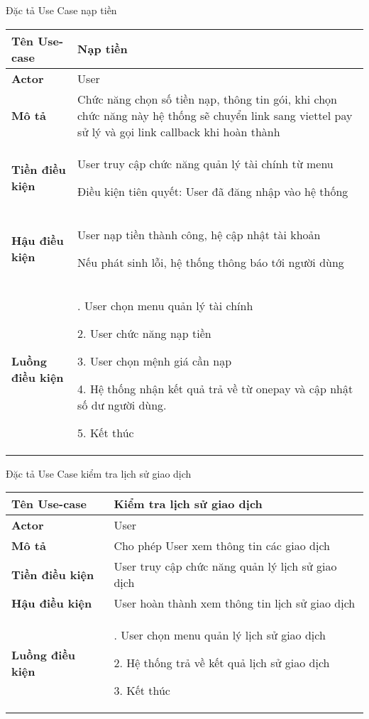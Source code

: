 \documentclass[12pt,a4paper]{report}
\begin{document}
 Đặc tả Use Case nạp tiền
 \begin{center}
 \begin{tabular}{|>{\raggedright\arraybackslash}m{4cm}|>{\raggedright\arraybackslash}m{11.5cm}|}
 \hline 
 \textbf{Tên Use-case} & Nạp tiền \\ 
 \hline 
 \textbf{Actor} & User \\ 
 \hline 
\textbf{ Mô tả} & Chức năng chọn số tiền nạp, thông tin gói, khi chọn chức năng này hệ thống sẽ chuyển link sang viettel pay sử lý và gọi link callback khi hoàn thành \\ 
 \hline 
 \textbf{Tiền điều kiện} & User truy cập chức năng quản lý tài chính từ menu
 
						   Điều kiện tiên quyết: User đã đăng nhập vào hệ thống\\ 
 \hline 
 \textbf{Hậu điều kiện} & User nạp tiền thành công, hệ cập nhật tài khoản
 
 Nếu phát sinh lỗi, hệ thống thông báo tới người dùng \\ 
 \hline 
 \textbf{Luồng điều kiện} & 1. User chọn menu quản lý tài chính
 
				   2. User chức năng nạp tiền

			       3. User chọn mệnh giá cần nạp

				   4. Hệ thống nhận kết quả trả về từ onepay và cập nhật số dư người dùng.
				   
				   5. Kết thúc\\ 
 \hline  
 \end{tabular} 
 \end{center}
 
 Đặc tả Use Case kiểm tra lịch sử giao dịch
 \begin{center}
 \begin{tabular}{|>{\raggedright\arraybackslash}m{4cm}|>{\raggedright\arraybackslash}m{11.5cm}|}
 \hline 
 \textbf{Tên Use-case} & Kiểm tra lịch sử giao dịch \\ 
 \hline 
 \textbf{Actor} & User \\ 
 \hline 
\textbf{ Mô tả} & Cho phép User xem thông tin các giao dịch \\ 
 \hline 
 \textbf{Tiền điều kiện} & User truy cập chức năng quản lý lịch sử giao dịch\\ 
 \hline 
 \textbf{Hậu điều kiện} & User hoàn thành xem thông tin lịch sử giao dịch \\ 
 \hline 
 \textbf{Luồng điều kiện} & 1. User chọn menu quản lý lịch sử giao dịch
 
				   2. Hệ thống trả về kết quả lịch sử giao dịch

			       3. Kết thúc\\ 
 \hline  
 \end{tabular} 
 \end{center}
 
\end{document}
